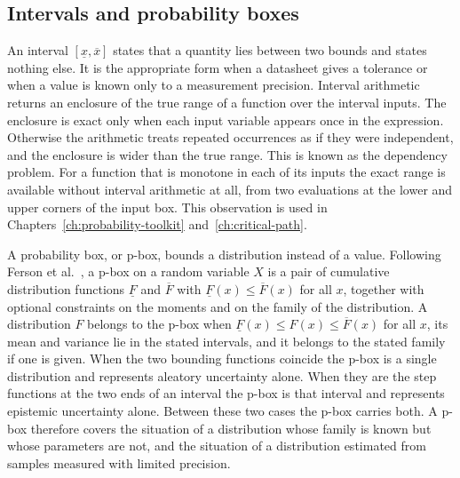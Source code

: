 \documentclass[12pt]{report}
\begin{document}
\subsection{Intervals and probability boxes}
\label{sec:bg-pbox}

An interval $[\underline{x}, \overline{x}]$ states that a quantity lies between two bounds and
states nothing else. It is the appropriate form when a datasheet gives a tolerance or when a
value is known only to a measurement precision. Interval arithmetic returns an enclosure of the true range of a function over the interval
inputs. The enclosure is exact only when each input variable appears once in the expression.
Otherwise the arithmetic treats repeated occurrences as if they were independent, and the
enclosure is wider than the true range. This is known as the dependency problem. For a function that is monotone in each of its inputs the exact range
is available without interval arithmetic at all, from two evaluations at the lower and upper
corners of the input box. This observation is used in Chapters~\ref{ch:probability-toolkit}
and~\ref{ch:critical-path}.

A probability box, or p-box, bounds a distribution instead of a value. Following Ferson et
al.\ \cite{ferson2003constructing}, a p-box on a random variable $X$ is a pair of cumulative
distribution functions $\underline{F}$ and $\overline{F}$ with
$\underline{F}(x) \le \overline{F}(x)$ for all $x$, together with optional constraints on the
moments and on the family of the distribution. A distribution $F$ belongs to the p-box when
$\underline{F}(x) \le F(x) \le \overline{F}(x)$ for all $x$, its mean and variance lie in the
stated intervals, and it belongs to the stated family if one is given. When the two bounding
functions coincide the p-box is a single distribution and represents aleatory uncertainty
alone. When they are the step functions at the two ends of an interval the p-box is that
interval and represents epistemic uncertainty alone. Between these two cases the p-box carries
both. A p-box therefore covers the situation of a distribution whose family is known but whose
parameters are not, and the situation of a distribution estimated from samples measured with
limited precision.
\end{document}
